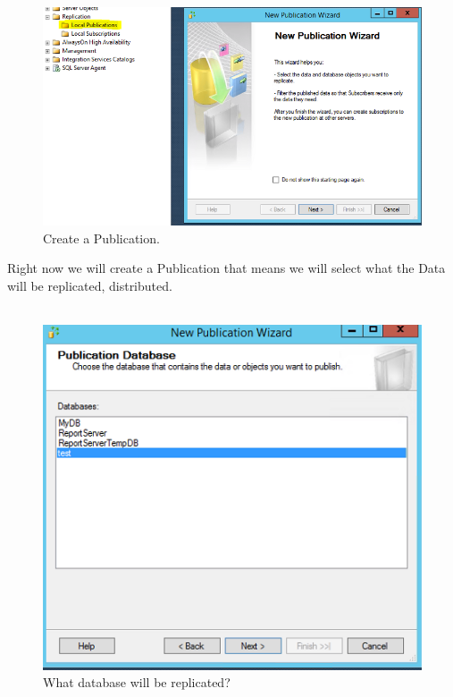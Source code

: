 \documentclass[english]{article}
\begin{document}
\begin{figure}[H]
\centerline{\includegraphics[scale=0.8]{administration/rep/11}}
\caption{Create a Publication.}
\end{figure}
Right now we will create a Publication that means we will select what the Data will be replicated, distributed. \\\\
\begin{figure}[H]
\centerline{\includegraphics[scale=0.82]{administration/rep/12}}
\caption{What database will be replicated?}
\end{figure}
\end{document}
